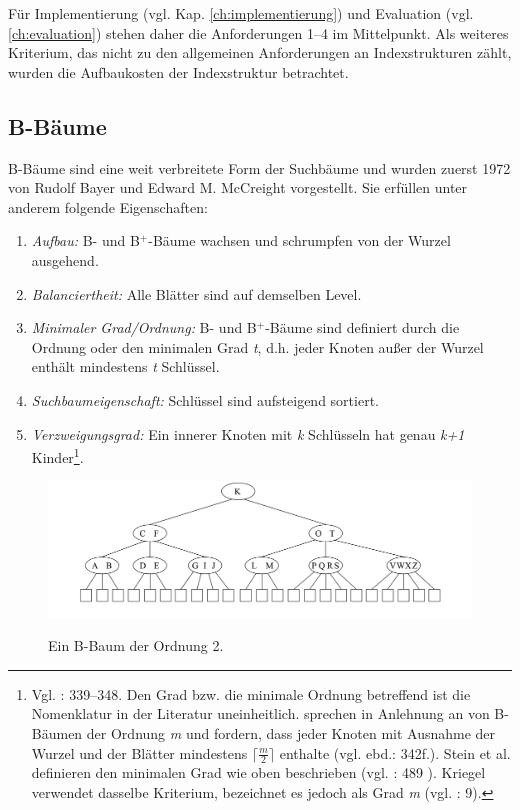 Für Implementierung (vgl. Kap. \ref{ch:implementierung}) und Evaluation (vgl. \ref{ch:evaluation}) stehen daher die Anforderungen 1--4 im Mittelpunkt. Als weiteres Kriterium, das nicht zu den allgemeinen Anforderungen an Indexstrukturen zählt, wurden die Aufbaukosten der Indexstruktur betrachtet. 
\subsection{B-Bäume}\label{sec:b-bäume}
B-Bäume sind eine weit verbreitete Form der Suchbäume und wurden zuerst 1972 von Rudolf Bayer und Edward M. McCreight vorgestellt. Sie erfüllen unter anderem folgende Eigenschaften:  
\begin{enumerate}
	\item \textit{Aufbau:} B- und B$^+$-Bäume wachsen und schrumpfen von der Wurzel ausgehend.
	\item \textit{Balanciertheit:} Alle Blätter sind auf demselben Level. 
	\item \textit{Minimaler Grad/Ordnung:} B- und B$^+$-Bäume sind definiert durch die Ordnung oder den minimalen Grad \textit{t}, d.h. jeder Knoten außer der Wurzel enthält mindestens \textit{t} Schlüssel. 
	\item \textit{Suchbaumeigenschaft:} Schlüssel sind aufsteigend sortiert.
	\item \textit{Verzweigungsgrad:} Ein innerer Knoten mit \textit{k} Schlüsseln hat genau \textit{k+1} Kinder\footnote{Vgl. \cite{Ottmann2012}: 339--348. Den Grad bzw. die minimale Ordnung betreffend ist die Nomenklatur in der Literatur uneinheitlich. \cite{Ottmann2012} sprechen in Anlehnung an \cite{Knuth1999}	 von B-Bäumen der Ordnung \textit{m} und fordern, dass jeder Knoten mit Ausnahme der Wurzel und der Blätter mindestens $\lceil\frac{m}{2}\rceil$ enthalte (vgl. ebd.: 342f.). Stein et al. definieren den minimalen Grad wie oben beschrieben (vgl. \cite{Stein2009}:  489
). Kriegel verwendet dasselbe Kriterium, bezeichnet es jedoch als Grad \textit{m} (vgl. \cite{Kriegel1994--2013}: 9).}.
\end{enumerate} 
\begin{figure}[hpbt]
  \centering
  \includegraphics[width=1.0\textwidth]{pictures/b-baum.png}\\
  \caption[Ein B-Baum der Ordnung 2 (Bildnachweis: \cite{Kriegel1994--2013}: 9)]{Ein B-Baum der Ordnung 2.}\label{fig:pic3}
\end{figure}
